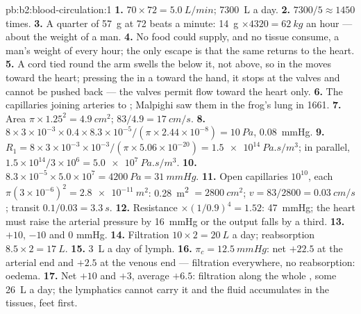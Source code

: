 \begin{solution}{pb:b2:blood-circulation:1}
\textbf{1.} $70\times 72 = \qty{5.0}{L/min}$; \qty{7300}{L} a day.
\textbf{2.} $7300/5 \approx 1450$ times.
\textbf{3.} A quarter of \qty{57}{g} at 72 beats a minute: \qty{14}{g}
$\times 4320 = \qty{62}{kg}$ an hour --- about the weight of a man.
\textbf{4.} No food could supply, and no tissue consume, a man's
weight of  every hour; the only escape is that the same 
returns to the heart.
\textbf{5.} A cord tied round the arm swells the  below it, not
above, so  in the  moves toward the heart; pressing the
 in a  toward the hand, it stops at the valves and cannot be
pushed back --- the valves permit flow toward the heart only.
\textbf{6.} The capillaries joining arteries to ; Malpighi saw
them in the frog's lung in 1661.
\textbf{7.} Area $\pi\times 1.25^{2} = \qty{4.9}{cm^2}$; $83/4.9 =
\qty{17}{cm/s}$.
\textbf{8.} $8\times 3\times 10^{-3}\times 0.4\times 8.3\times
10^{-5}/(\pi\times 2.44\times 10^{-8}) = \qty{10}{Pa}$, \qty{0.08}{mmHg}.
\textbf{9.} $R_{1} = 8\times 3\times 10^{-3}\times 10^{-3}/(\pi\times
5.06\times 10^{-20}) = \qty{1.5e14}{Pa.s/m^3}$; in parallel,
$1.5\times 10^{14}/3\times 10^{6} = \qty{5.0e7}{Pa.s/m^3}$.
\textbf{10.} $8.3\times 10^{-5}\times 5.0\times 10^{7} = \qty{4200}{Pa}
= \qty{31}{mmHg}$.
\textbf{11.} Open capillaries $10^{10}$, each $\pi(3\times 10^{-6})^{2}
= \qty{2.8e-11}{m^2}$: \qty{0.28}{m^2} $= \qty{2800}{cm^2}$; $v =
83/2800 = \qty{0.03}{cm/s}$; transit $0.1/0.03 = \qty{3.3}{s}$.
\textbf{12.} Resistance $\times(1/0.9)^{4} = 1.52$: \qty{47}{mmHg}; the
heart must raise the arterial pressure by \qty{16}{mmHg} or the
output falls by a third.
\textbf{13.} $+10$, $-10$ and $0$ mmHg.
\textbf{14.} Filtration $10\times 2 = \qty{20}{L}$ a day; reabsorption
$8.5\times 2 = \qty{17}{L}$.
\textbf{15.} \qty{3}{L} a day of lymph.
\textbf{16.} $\pi_c = \qty{12.5}{mmHg}$: net $+22.5$ at the arterial
end and $+2.5$ at the venous end --- filtration everywhere, no
reabsorption: oedema.
\textbf{17.} Net $+10$ and $+3$, average $+6.5$: filtration along the
whole , some \qty{26}{L} a day; the lymphatics cannot carry
it and the fluid accumulates in the tissues, feet first.

\end{solution}
